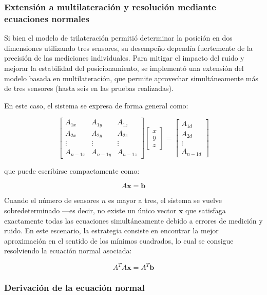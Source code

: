 \subsubsection*{Extensión a multilateración y resolución mediante ecuaciones normales}

Si bien el modelo de trilateración permitió determinar la posición en dos dimensiones utilizando tres sensores, su desempeño dependía fuertemente de la precisión de las mediciones individuales. Para mitigar el impacto del ruido y mejorar la estabilidad del posicionamiento, se implementó una extensión del modelo basada en multilateración, que permite aprovechar simultáneamente más de tres sensores (hasta seis en las pruebas realizadas).

En este caso, el sistema se expresa de forma general como:

\[
\begin{bmatrix}
A_{1x} & A_{1y} & A_{1z}\\
A_{2x} & A_{2y} & A_{2z}\\
\vdots & \vdots & \vdots\\
A_{n-1x} & A_{n-1y} & A_{n-1z}
\end{bmatrix}
\begin{bmatrix}
x \\ y \\ z
\end{bmatrix}
=
\begin{bmatrix}
A_{1d}\\
A_{2d}\\
\vdots\\
A_{n-1d}
\end{bmatrix}
\]

que puede escribirse compactamente como:

\[
A \mathbf{x} = \mathbf{b}
\]

Cuando el número de sensores $n$ es mayor a tres, el sistema se vuelve sobredeterminado —es decir, no existe un único vector $\mathbf{x}$ que satisfaga exactamente todas las ecuaciones simultáneamente debido a errores de medición y ruido. En este escenario, la estrategia consiste en encontrar la mejor aproximación en el sentido de los mínimos cuadrados, lo cual se consigue resolviendo la ecuación normal asociada:

\[
A^T A \mathbf{x} = A^T \mathbf{b}
\]

\subsubsection*{Derivación de la ecuación normal}

